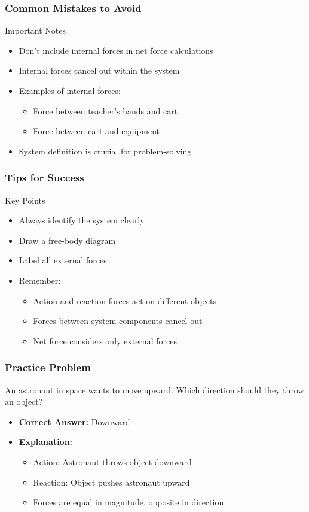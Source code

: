 \documentclass{beamer}
\begin{document}
\begin{frame}
\frametitle{Common Mistakes to Avoid}
\begin{alertblock}{Important Notes}
\begin{itemize}
    \item Don't include internal forces in net force calculations
    \item Internal forces cancel out within the system
    \item Examples of internal forces:
    \begin{itemize}
        \item Force between teacher's hands and cart
        \item Force between cart and equipment
    \end{itemize}
    \item System definition is crucial for problem-solving
\end{itemize}
\end{alertblock}
\end{frame}

\begin{frame}
\frametitle{Tips for Success}
\begin{block}{Key Points}
\begin{itemize}
    \item Always identify the system clearly
    \item Draw a free-body diagram
    \item Label all external forces
    \item Remember:
    \begin{itemize}
        \item Action and reaction forces act on different objects
        \item Forces between system components cancel out
        \item Net force considers only external forces
    \end{itemize}
\end{itemize}
\end{block}
\end{frame}

\begin{frame}
\frametitle{Practice Problem}
An astronaut in space wants to move upward. Which direction should they throw an object?
\end{frame}

\begin{frame}
\begin{itemize}
    \item \textbf{Correct Answer:} Downward
    \item \textbf{Explanation:}
    \begin{itemize}
        \item Action: Astronaut throws object downward
        \item Reaction: Object pushes astronaut upward
        \item Forces are equal in magnitude, opposite in direction
    \end{itemize}
\end{itemize}
\end{frame}
\end{document}
